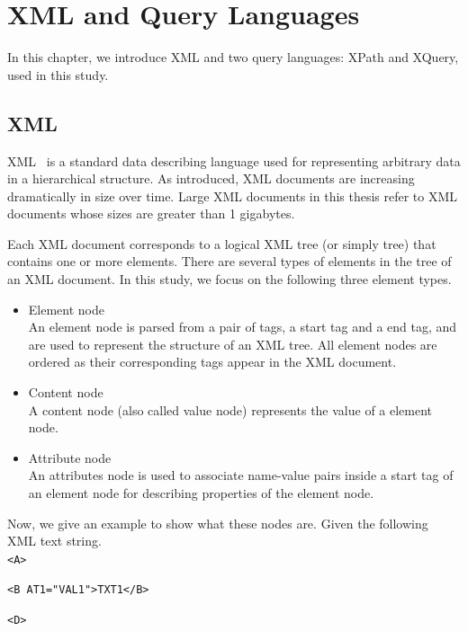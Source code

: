 \chapter{XML and Query Languages}

In this chapter, we introduce XML and two query languages: XPath
and XQuery, used in this study.


\section{XML}

XML~\cite{XML} is a standard data describing language used for representing
arbitrary data in a hierarchical structure. As introduced, XML
documents are increasing dramatically in size over time. Large XML documents in
this thesis refer to XML documents whose sizes are greater than 1 gigabytes.

Each XML document corresponds to a logical XML tree (or simply tree) that
contains one or more elements.  There are several types of elements in the tree
of an XML document. In this study, we focus on the following three element
types.

\begin{itemize}
	\item Element node \\
	An element node is parsed from a pair of tags, a start tag and a end tag, and
	are used to represent the structure of an XML tree. All element nodes are
	ordered as their corresponding tags appear in the XML document.
	\item Content node \\
	A content node (also called value node) represents the value of a element node.
	\item Attribute node \\
	An attributes node is used to associate name-value pairs inside a start tag of
	an element node for describing properties of the element node.
\end{itemize}


Now, we give an example to show what these nodes are. Given the following
XML text string.\\

\hspace{10ex}\texttt{<A>}

\hspace{14ex}\texttt{<B AT1="VAL1">TXT1</B>}

\hspace{14ex}\texttt{<D>}

